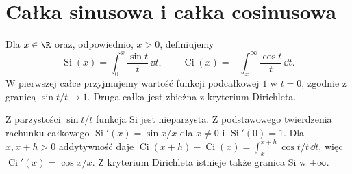\section{Całka sinusowa i całka cosinusowa}
\begin{definicja}
\label{ma1:def:si-ci}
Dla $x\in\R$ oraz, odpowiednio, $x>0$, definiujemy
\[
 \operatorname{Si}(x)=\int_0^x\frac{\sin t}{t}\,\dd t,
 \qquad
 \operatorname{Ci}(x)=-\int_x^\infty\frac{\cos t}{t}\,\dd t.
\]
W pierwszej całce przyjmujemy wartość funkcji podcałkowej $1$ w $t=0$, zgodnie z granicą $\sin t/t\to1$. Druga całka jest zbieżna z kryterium Dirichleta.
\end{definicja}
Z parzystości $\sin t/t$ funkcja Si jest nieparzysta. Z podstawowego twierdzenia rachunku całkowego $\operatorname{Si}'(x)=\sin x/x$ dla $x\ne0$ i $\operatorname{Si}'(0)=1$. Dla $x,x+h>0$ addytywność daje $\operatorname{Ci}(x+h)-\operatorname{Ci}(x)=\int_x^{x+h}\cos t/t\,\dd t$, więc $\operatorname{Ci}'(x)=\cos x/x$. Z kryterium Dirichleta istnieje także granica Si w $+\infty$.

